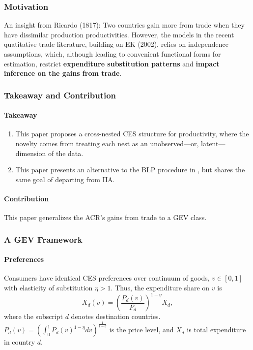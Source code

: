 \subsubsection{Motivation}
An insight from Ricardo (1817):
Two countries gain more from trade when they have dissimilar production productivities.
However, the models in the recent quatitative trade literature, building on EK (2002), relies on independence assumptions,
which, although leading to convenient functional forms for estimation,
restrict \textbf{expenditure substitution patterns} and 
\textbf{impact inference on the gains from trade}.

\subsubsection{Takeaway and Contribution}
\paragraph{Takeaway}
\begin{enumerate}
    \item This paper proposes a cross-nested CES structure for productivity, 
where the novelty comes from treating each nest as an unobserved—or, latent—dimension of the data.
    \item This paper presents an alternative to the BLP procedure in \citep{Adao:2017}, but shares the same
    goal of departing from IIA.
\end{enumerate}

\paragraph{Contribution}
This paper generalizes the ACR's gains from trade to a GEV class.

\subsubsection{A GEV Framework}
\paragraph{Preferences}
Consumers have identical CES preferences over continuum of goods, $v \in [0,1]$ 
with elasticity of substitution $\eta > 1$.
Thus, the expenditure share on $v$ is 
\begin{equation}
    X_d(v) = \left(\frac{P_d(v)}{P_d}\right)^{1-\eta} X_d,
\end{equation}
where the subscript $d$ denotes destination countries.
$P_d(v) = \left(\int_0^1 P_d(v)^{1-\eta} dv \right)^{\frac{1}{1-\eta}}$
is the price level, and $X_d$ is total expenditure in country $d$.

